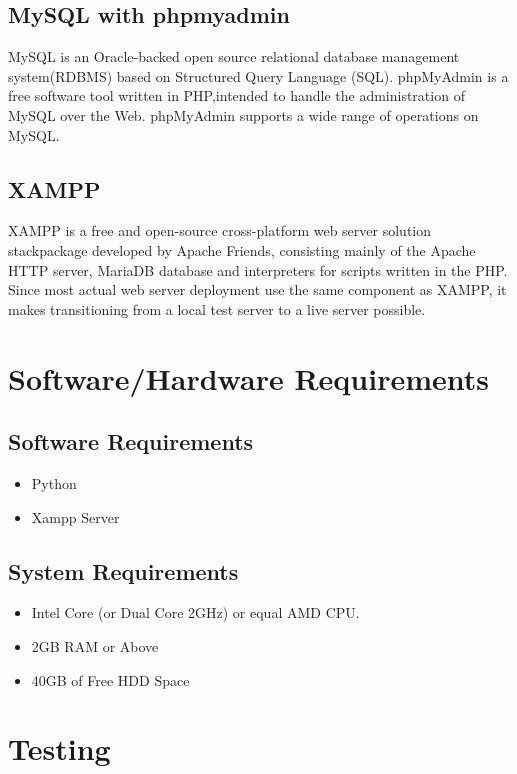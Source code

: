 \documentclass{mnnit}
\begin{document}
\section{MySQL with phpmyadmin}
MySQL is an Oracle-backed open source relational database management system(RDBMS) based on Structured Query Language (SQL). phpMyAdmin is a free software tool written in PHP,intended to handle the administration of MySQL over the Web.  phpMyAdmin supports a wide range of operations on MySQL.
\section{XAMPP}
XAMPP is a free and open-source cross-platform web server solution stackpackage developed by Apache Friends, consisting mainly of the Apache HTTP server, MariaDB database and interpreters for scripts written in the PHP. Since most actual web server deployment use the same component as XAMPP, it makes transitioning from a local test server to a live server possible.

\chapter{Software/Hardware Requirements}
\section{Software Requirements}
\begin{itemize}
	\item Python
    \item Xampp Server
\end{itemize}
\section{System Requirements}
\begin{itemize}
	\item Intel Core (or Dual Core 2GHz) or equal AMD CPU.
	\item 2GB RAM or Above
	\item 40GB of Free HDD Space
\end{itemize}


\chapter{Testing}
\end{document}
